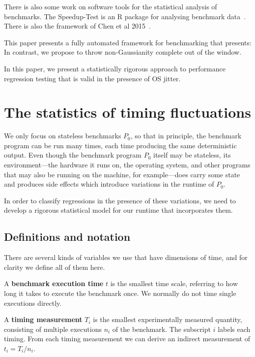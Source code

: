 \documentclass[conference]{IEEEtran}
\begin{document}
There is also some work on software tools for the statistical analysis of benchmarks. The Speedup-Test is an R package for analysing benchmark data~\cite{Touati2013}. There is also the framework of Chen et al 2015~\cite{Chen2015}.

This paper presents a fully automated framework for benchmarking that presents:
In contrast, we propose to throw non-Gaussianity complete out of the window.

In this paper, we present a statistically rigorous approach to performance regression
testing that is valid in the presence of OS jitter.



\section{The statistics of timing fluctuations}

We only focus on stateless benchmarks $P_0$, so that in principle, the benchmark program can be run many times, each time producing the same deterministic output. Even though the benchmark program $P_0$ itself may be stateless, its environment---the hardware it runs on, the operating system, and other programs that may also be running on the machine, for example---does carry some state and produces side effects which introduce variations in the runtime of $P_0$.

In order to classify regressions in the presence of these variations, we need to develop a rigorous statistical model for our runtime that incorporates them.

\subsection{Definitions and notation}

There are several kinds of variables we use that have dimensions of time, and for clarity we define all of them here.

A \textbf{benchmark execution time} $t$ is the smallest time scale, referring to how long it takes to execute the benchmark once. We normally do not time single executions directly.

A \textbf{timing measurement} $T_i$ is the smallest experimentally measured quantity, consisting of multiple executions $n_i$ of the benchmark. The subscript $i$ labels each timing. From each timing measurement we can derive an indirect measurement of $t_i = T_i/n_i$.
\end{document}
